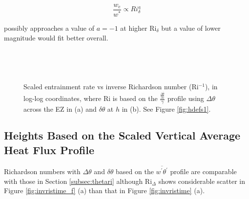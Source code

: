 \begin{equation}
\frac{w_{e}}{w^{*}} \propto Ri_{\delta}^{a}
\end{equation}

possibly approaches a value of $a = -1$ at higher \acs{Ri}$_{\delta}$ but a value of lower magnitude would fit better overall. \\    

\begin{figure}[htbp]
\begin{minipage}[b]{0.5\linewidth}
        \\
        \end{minipage}             
\quad
\begin{minipage}[b]{0.5\linewidth}
        \\       
       \end{minipage}
        \caption[Scaled Entrainment Rate vs inverse Richardson Number (i)]{Scaled entrainment rate vs inverse Richardson number (\acs{Ri}$^{-1}$), in log-log coordinates, where \acs{Ri} is based on the $\frac{\frac{\partial \overline{\theta}}{\partial z}}{\gamma}$ profile using $\Delta \theta$ across the \acs{EZ} in (a) and $\delta \theta$ at $h$ in (b). See Figure \ref{fig:hdefs1}.}
        \label{fig:weinvri}
\end{figure}

\clearpage

\subsection{Heights Based on the Scaled Vertical Average Heat Flux Profile}

Richardson numbers with $\Delta \theta$ and $\delta \theta$ based on the $\overline{w^{'}\theta^{'}}$ profile are comparable with those in Section \ref{subsec:thetari} although \acs{Ri}$_{\Delta}$ shows considerable scatter in Figure \ref{fig:invristime_f} (a) than that in Figure \ref{fig:invristime} (a).

